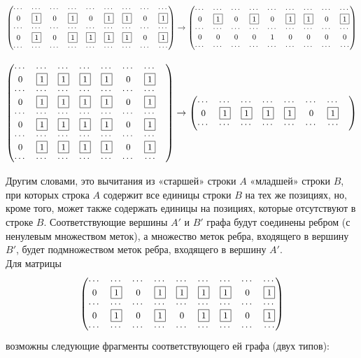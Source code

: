 \[
{\small
\begin{pmatrix}
    \cdots & \cdots & \cdots & \cdots & \cdots & \cdots & \cdots & \cdots & \cdots \cr
    0 & \fbox{1} & 0 & \fbox{1} & 0 & \fbox{1} & \fbox{1} & 0 & \fbox{1} \cr
    \cdots & \cdots & \cdots & \cdots & \cdots & \cdots & \cdots & \cdots & \cdots \cr
    0 & \fbox{1} & 0 & \fbox{1} & \fbox{1} & \fbox{1} & \fbox{1} & 0 & \fbox{1} \cr
    \cdots & \cdots & \cdots & \cdots & \cdots & \cdots & \cdots & \cdots & \cdots
\end{pmatrix}
\rightarrow
\begin{pmatrix}
    \cdots & \cdots & \cdots & \cdots & \cdots & \cdots & \cdots & \cdots & \cdots \cr
    0 & \fbox{1} & 0 & \fbox{1} & 0 & \fbox{1} & \fbox{1} & 0 & \fbox{1} \cr
    \cdots & \cdots & \cdots & \cdots & \cdots & \cdots & \cdots & \cdots & \cdots \cr
    0 & 0 & 0 & 0 & 1 & 0 & 0 & 0 & 0 \cr
    \cdots & \cdots & \cdots & \cdots & \cdots & \cdots & \cdots & \cdots & \cdots
\end{pmatrix}
}
\]

\[
{\small
\begin{pmatrix}
    \cdots & \cdots & \cdots & \cdots & \cdots & \cdots & \cdots & \cr
    0 & \fbox{1} & \fbox{1} & \fbox{1} & \fbox{1} & 0 & \fbox{1} \cr
    \cdots & \cdots & \cdots & \cdots & \cdots & \cdots & \cdots & \cr
    0 & \fbox{1} & \fbox{1} & \fbox{1} & \fbox{1} & 0 & \fbox{1} \cr
    \cdots & \cdots & \cdots & \cdots & \cdots & \cdots & \cdots & \cr
    0 & \fbox{1} & \fbox{1} & \fbox{1} & \fbox{1} & 0 & \fbox{1} \cr
    \cdots & \cdots & \cdots & \cdots & \cdots & \cdots & \cdots & \cr
    0 & \fbox{1} & \fbox{1} & \fbox{1} & \fbox{1} & 0 & \fbox{1} \cr
    \cdots & \cdots & \cdots & \cdots & \cdots & \cdots & \cdots
\end{pmatrix}
\rightarrow
\begin{pmatrix}
    \cdots & \cdots & \cdots & \cdots & \cdots & \cdots & \cdots & \cr
    0 & \fbox{1} & \fbox{1} & \fbox{1} & \fbox{1} & 0 & \fbox{1} \cr
    \cdots & \cdots & \cdots & \cdots & \cdots & \cdots & \cdots
\end{pmatrix}
}
\]

Другим словами, это вычитания из «старшей» строки $A$ «младшей» стро­ки $B$, при которых строка $A$ содержит все единицы строки $B$ на тех же позициях, но, кроме того, может также содержать единицы на позициях, кото­рые отсутствуют в строке $B$. Соответствующие вершины $A'$ и $B'$ графа будут соединены ребром (с ненулевым множеством меток), а множество меток ребра, входящего в вершину $B'$, будет подмножеством меток ребра, входящего в вер­шину $A'$.
\\[24pt]
\noindent Для матрицы
\[
{\small
\begin{pmatrix}
    \cdots & \cdots & \cdots & \cdots & \cdots & \cdots & \cdots & \cdots & \cdots \cr
    0 & \fbox{1} & 0 & \fbox{1} & \fbox{1} & \fbox{1} & \fbox{1} & 0 & \fbox{1} \cr
    \cdots & \cdots & \cdots & \cdots & \cdots & \cdots & \cdots & \cdots & \cdots \cr
    0 & \fbox{1} & 0 & \fbox{1} & 0 & \fbox{1} & \fbox{1} & 0 & \fbox{1} \cr
    \cdots & \cdots & \cdots & \cdots & \cdots & \cdots & \cdots & \cdots & \cdots
\end{pmatrix}
}
\]
возможны следующие фрагменты соответствующего ей графа (двух типов):

